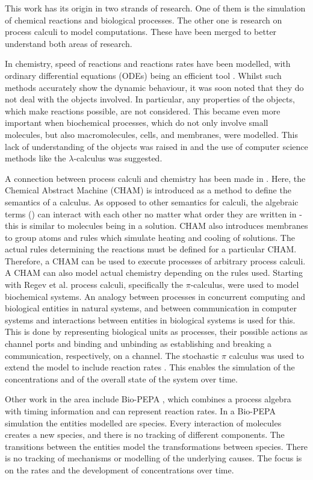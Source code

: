 ﻿This work has its origin in two strands of research. One of them is the simulation of chemical reactions and biological processes. The other one is research on process calculi to model computations. These have been merged  to better understand both areas of research. 

In chemistry, speed of reactions and reactions rates have been modelled, with ordinary differential equations (ODEs) being an efficient tool \cite{higham}. Whilst such methods accurately show the dynamic behaviour, it was soon noted that they do not deal with the objects involved. In particular, any properties of the objects, which make reactions possible, are not considered. This became even more important when biochemical processes, which do not only involve small molecules, but also macromolecules, cells, and membranes, were modelled. This lack of understanding of the objects was raised in \cite{fontana} and the use of computer science methods like the $\lambda$-calculus was suggested. 

A connection between process calculi and chemistry has been made in \cite{chamjournal}. Here, the Chemical Abstract Machine (CHAM) is introduced as a method to define the semantics of a calculus. As opposed to other semantics for calculi, the algebraic terms () can interact with each other no matter what order they are written in - this is similar to molecules being in a solution. CHAM also introduces membranes to group atoms and rules which simulate heating and cooling of solutions. The actual rules determining the reactions must be defined for a particular CHAM. Therefore, a CHAM can be used to execute processes of arbitrary process calculi. A CHAM can also model actual chemistry depending on the rules used. Starting with Regev et al. \cite{regev2000} process calculi, specifically the $\pi$-calculus, were used to model biochemical systems. An analogy between processes in concurrent computing and biological entities in natural systems, and between communication in computer systems and interactions between entities in biological systems is used for this. This is done by representing biological units as processes, their possible actions as channel ports and binding and unbinding as establishing and breaking a communication, respectively, on a channel. The stochastic $\pi$ calculus \cite{PriamiStochasticPi} was used to extend the model to include reaction rates \cite{PriameRegev}. This enables the simulation of the concentrations and of the overall state of the system over time. 

Other work in the area include Bio-PEPA \cite{CiocchettaBiopepa}, which combines a process algebra with timing information and can represent reaction rates. In a Bio-PEPA simulation the entities modelled are species. Every interaction of molecules creates a new species, and there is no tracking of different components. The transitions between the entities model the transformations between species. There is no tracking of mechanisms or modelling of the underlying causes. The focus is on the rates and the development of concentrations over time.  

